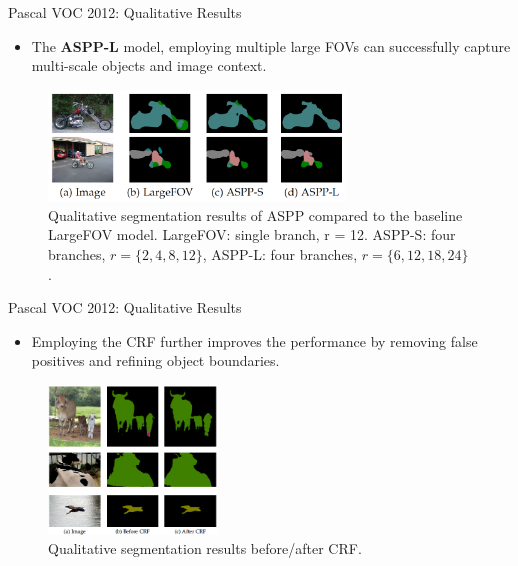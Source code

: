 \documentclass{beamer}
\begin{document}
\begin{frame}{Pascal VOC 2012: Qualitative Results}
\begin{itemize}
	\item The \textbf{ASPP-L} model, employing multiple large FOVs can successfully capture multi-scale objects and image context.
\end{itemize}	
\begin{figure}
	\centering
	\includegraphics[width=0.7\textwidth]{figure/ss29.png}
	\captionsetup{justification=centering}
	\caption{Qualitative segmentation results of ASPP compared to the baseline LargeFOV model. {\color{blue}LargeFOV}: single branch, r = 12. {\color{blue}ASPP-S}: four branches, $r=\{2, 4, 8, 12\}$, {\color{blue}ASPP-L}: four branches, $r = \{6, 12, 18, 24\}$.}
\end{figure}
\end{frame}

\begin{frame}{Pascal VOC 2012: Qualitative Results}
\begin{itemize}
	\item Employing the {\color{blue}CRF} further improves the performance by removing false positives and refining object boundaries.
\end{itemize}	
\begin{figure}
	\centering
	\includegraphics[width=0.40\textwidth]{figure/ss30.png}
	\captionsetup{justification=centering}
	\caption{Qualitative segmentation results before/after CRF.}
\end{figure}
\end{frame}
\end{document}
